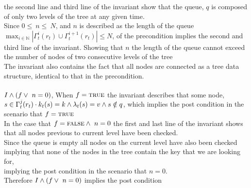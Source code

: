 \documentclass[headings=small,a4paper,12pt]{scrartcl}
\begin{document}
the second line and third line of the invariant show that the queue, $q$ is composed of only two levels of the tree at any given time.\\
Since $0\leq~n\leq~N$, and $n$ is described as the length of the queue\\ $\max_{i\in\mathbb{N}}|\Gamma_t^{i}(r_t)\cup\Gamma_{t}^{i+1}(r_t)|\leq N$, of the precondition implies the second and third line of the invariant. Showing that $n$ the length of the queue cannot exceed the number of nodes of two consecutive levels of the tree\\
The invariant also contains the fact that all nodes are connected as a tree data structure, identical to that in the precondition.\\
\\
$I\wedge(f\vee~n=0)$, When $f=\text{\textsc{true}}$ the invariant describes that some node,\\ $s\in\Gamma^j_t(r_t)\cdot{}k_t(s) = k\wedge \lambda_t(s) = v\wedge s\notin q$, which implies the post condition in the scenario that $f = \text{\textsc{true}}$\\
In the case that $f=\text{\textsc{false}}\wedge~n=0$ the first and last line of the invariant shows that all nodes previous to current level have been checked.\\ Since the queue is empty all nodes on the current level have also been checked implying that none of the nodes in the tree contain the key that we are looking for,\\ implying the post condition in the scenario that $n=0$.\\
Therefore $I\wedge(f\vee~n=0)$ implies the post condition\\
\break
\end{document}
